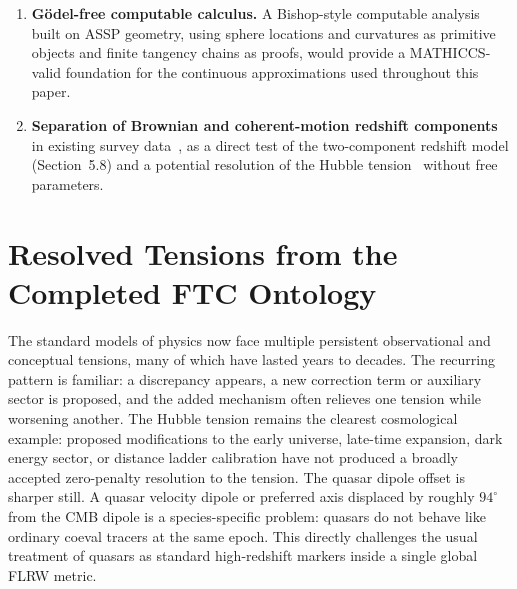 \documentclass[11pt,a4paper]{article}
\begin{document}
\begin{enumerate}
  \item \textbf{Gödel-free computable calculus.} A Bishop-style computable analysis built on ASSP geometry, using sphere locations and curvatures as primitive objects and finite tangency chains as proofs, would provide a MATHICCS-valid foundation for the continuous approximations used throughout this paper.

  \item \textbf{Separation of Brownian and coherent-motion redshift components} in existing survey data~\cite{Secrest2022,Secrest2025}, as a direct test of the two-component redshift model (Section~5.8) and a potential resolution of the Hubble tension~\cite{Riess2025} without free parameters.

\end{enumerate}


\section{Resolved Tensions from the Completed FTC Ontology}
\label{sec:resolved_tensions}

The standard models of physics now face multiple persistent observational and conceptual tensions, many of which have lasted years to decades. The recurring pattern is familiar: a discrepancy appears, a new correction term or auxiliary sector is proposed, and the added mechanism often relieves one tension while worsening another. The Hubble tension remains the clearest cosmological example: proposed modifications to the early universe, late-time expansion, dark energy sector, or distance ladder calibration have not produced a broadly accepted zero-penalty resolution to the tension. The quasar dipole offset is sharper still. A quasar velocity dipole or preferred axis displaced by roughly \(94^\circ\) from the CMB dipole is a species-specific problem: quasars do not behave like ordinary coeval tracers at the same epoch. This directly challenges the usual treatment of quasars as standard high-redshift markers inside a single global FLRW metric.
\end{document}
